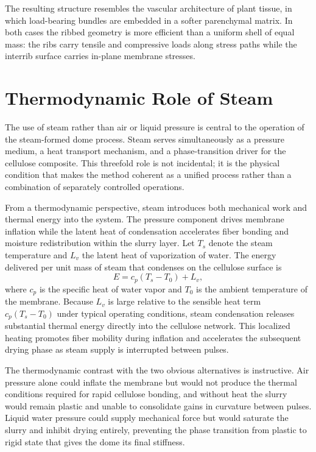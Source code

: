\documentclass[12pt,a4paper]{article}
\begin{document}
The resulting structure resembles the vascular architecture of plant
tissue, in which load-bearing bundles are embedded in a softer
parenchymal matrix. In both cases the ribbed geometry is more efficient
than a uniform shell of equal mass: the ribs carry tensile and
compressive loads along stress paths while the interrib surface carries
in-plane membrane stresses.

\section{Thermodynamic Role of Steam}

The use of steam rather than air or liquid pressure is central to the
operation of the steam-formed dome process. Steam serves simultaneously
as a pressure medium, a heat transport mechanism, and a phase-transition
driver for the cellulose composite. This threefold role is not
incidental; it is the physical condition that makes the method coherent
as a unified process rather than a combination of separately controlled
operations.

From a thermodynamic perspective, steam introduces both mechanical work
and thermal energy into the system. The pressure component drives
membrane inflation while the latent heat of condensation accelerates
fiber bonding and moisture redistribution within the slurry layer. Let
$T_s$ denote the steam temperature and $L_v$ the latent heat of
vaporization of water. The energy delivered per unit mass of steam that
condenses on the cellulose surface is
\begin{equation}
E = c_p(T_s - T_0) + L_v,
\end{equation}
where $c_p$ is the specific heat of water vapor and $T_0$ is the
ambient temperature of the membrane. Because $L_v$ is large relative
to the sensible heat term $c_p(T_s - T_0)$ under typical operating
conditions, steam condensation releases substantial thermal energy
directly into the cellulose network. This localized heating promotes
fiber mobility during inflation and accelerates the subsequent drying
phase as steam supply is interrupted between pulses.

The thermodynamic contrast with the two obvious alternatives is
instructive. Air pressure alone could inflate the membrane but would
not produce the thermal conditions required for rapid cellulose bonding,
and without heat the slurry would remain plastic and unable to consolidate
gains in curvature between pulses. Liquid water pressure could supply
mechanical force but would saturate the slurry and inhibit drying
entirely, preventing the phase transition from plastic to rigid state
that gives the dome its final stiffness.
\end{document}

